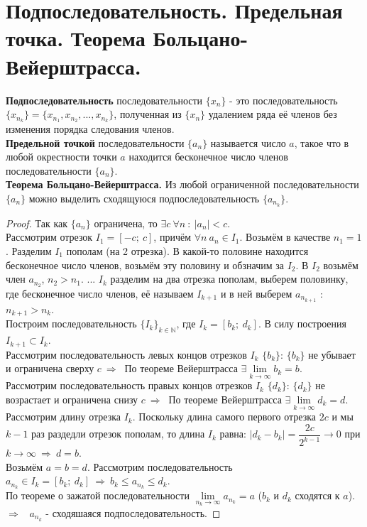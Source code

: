 \documentclass[12pt]{article}
\begin{document}
\section{Подпоследовательность. Предельная точка. Теорема Больцано-Вейерштрасса.}
\textbf{Подпоследовательность} последовательности $\{x_n\}$ - это последовательность $\{x_{n_k}\} = \{x_{n_1}, x_{n_2}, ..., x_{n_k}\}$, полученная из $\{x_n\}$ удалением ряда её членов без изменения порядка следования членов. \\
\textbf{Предельной точкой} последовательности $\{a_n\}$ называется число $a$, такое что в любой окрестности точки $a$ находится бесконечное число членов последовательности $\{a_n\}$. \\
\textbf{Теорема Больцано-Вейерштрасса.} Из любой ограниченной последовательности $\{a_n\}$ можно выделить сходящуюся подпоследовательность  $\{a_{n_k}\}$.
\begin{proof}
    Так как  $\{a_n\}$ ограничена, то $\exists c \ \forall n \ : \ |a_n| < c$. \\
    Рассмотрим отрезок $I_1 = [-c; \ c]$, причём $\forall n \ a_n \in I_1$. Возьмём в качестве $n_1 = 1$. Разделим $I_1$ пополам (на 2 отрезка). В какой-то половине находится бесконечное число членов, возьмём эту половину и обзначим за $I_2$. В $I_2$ возьмём член $a_{n_2}$, $n_2 > n_1$. ... $I_k$ разделим на два отрезка пополам, выберем половинку, где бесконечное число членов, её называем $I_{k+1}$ и в ней выберем $a_{n_{k+1}}$ : $n_{k+1} > n_k$. \\
    Построим последовательность $\{I_k\}_{k \in \mathbb{N}}$, где $I_k = [b_k; \ d_k]$. В силу построения $I_{k+1} \subset I_k$. \\ 
    Рассмотрим последовательность левых концов отрезков $I_k$ $\{b_k\}$: $\{b_k\}$ не убывает и ограничена сверху $c \ \Rightarrow \ $ По теореме Вейерштрасса $\exists \lim\limits_{k \to \infty} b_k = b$. \\
    Рассмотрим последовательность правых концов отрезков $I_k$ $\{d_k\}$: $\{d_k\}$ не возрастает и ограничена снизу $c \ \Rightarrow \ $ По теореме Вейерштрасса $\exists \lim\limits_{k \to \infty} d_k = d$. \\
    Рассмотрим длину отрезка $I_k$. Поскольку длина самого первого отрезка  $2c$ и мы $k-1$ раз раздедли отрезок пополам, то длина $I_k$ равна:  $|d_k - b_k| = \dfrac{2c}{2^{k-1}}  \to 0 $ при $k \to \infty \ \Rightarrow \ d = b$. \\
    Возьмём $a = b = d$. Рассмотрим последовательность $a_{n_k} \in I_k = [b_k; \ d_k] \ \Rightarrow \ b_k \leq a_{n_k} \leq d_k$. \\
    По теореме о зажатой последовательности $\lim\limits_{n_k \to \infty} a_{n_k} = a$ ($b_k$ и $d_k$ сходятся к $a$). \ $\Rightarrow$ \ 
    $a_{n_k}$ - сходяшаяся подпоследовательность.
\end{proof}
\end{document}
